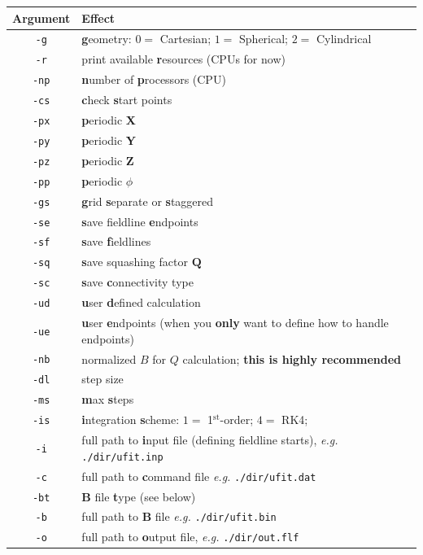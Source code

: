 \documentclass[12pt,twoside]{article}
\begin{document}
\begin{tabular}{|c|l|}		
		\hline
		\textbf{Argument} & \textbf{Effect} \\\hline\hline
		\texttt{-g} & \textbf{g}eometry: $0 =$ Cartesian; $1 =$ Spherical; $2 =$ Cylindrical  \\\hline
		\texttt{-r} & print available \textbf{r}esources (CPUs for now) \\\hline
		\texttt{-np} &  \textbf{n}umber of \textbf{p}rocessors (CPU) \\\hline
		\texttt{-cs} & \textbf{c}heck \textbf{s}tart points \\\hline
		\texttt{-px} & \textbf{p}eriodic \textbf{X} \\\hline
		\texttt{-py} & \textbf{p}eriodic \textbf{Y}  \\\hline
		\texttt{-pz} & \textbf{p}eriodic \textbf{Z}  \\\hline
		\texttt{-pp} & \textbf{p}eriodic $\phi$  \\\hline
		\texttt{-gs} & \textbf{g}rid \textbf{s}eparate or \textbf{s}taggered  \\\hline
		\texttt{-se} & \textbf{s}ave fieldline \textbf{e}ndpoints \\\hline
		\texttt{-sf} & \textbf{s}ave \textbf{f}ieldlines \\\hline
		\texttt{-sq} & \textbf{s}ave squashing factor $\mathbf{Q}$  \\\hline
		\texttt{-sc} & \textbf{s}ave \textbf{c}onnectivity type  \\\hline
		\texttt{-ud} & \textbf{u}ser \textbf{d}efined calculation  \\\hline
		\texttt{-ue} & \textbf{u}ser \textbf{e}ndpoints (when you \textbf{only} want to define how to handle endpoints)  \\\hline
		\texttt{-nb} & normalized $B$ for $Q$ calculation; \textbf{this is highly recommended} \\\hline
		\texttt{-dl} & step size \\\hline
		\texttt{-ms} & \textbf{m}ax \textbf{s}teps  \\\hline
		\texttt{-is} & \textbf{i}ntegration \textbf{s}cheme: $1 =$ 1$^{\mathrm{st}}$-order; $4 =$ RK4; \\\hline
		\texttt{-i} & full path to \textbf{i}nput file (defining fieldline starts), \textit{e.g.} \texttt{./dir/ufit.inp} \\\hline
		\texttt{-c} & full path to \textbf{c}ommand file \textit{e.g.} \texttt{./dir/ufit.dat} \\\hline
		\texttt{-bt} & $\mathbf{B}$ file \textbf{t}ype (see below) \\\hline
		\texttt{-b} & full path to $\mathbf{B}$ file \textit{e.g.} \texttt{./dir/ufit.bin} \\\hline
		\texttt{-o} & full path to \textbf{o}utput file, \textit{e.g.} \texttt{./dir/out.flf} \\\hline

\end{tabular}
\end{document}
